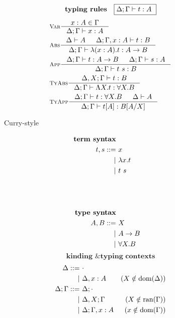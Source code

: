 \begin{figure}
\begin{singlespace}
\begin{minipage}{.46\textwidth}
\begin{align*}
\end{align*}
\[ \textbf{typing rules} \quad \framebox{$ \Delta;\Gamma |- t : A $ } \]
\vspace*{-1em}
\begin{align*}
& \inference[\sc Var]{x:A \in \Gamma}{\Delta;\Gamma |- x:A} \\
& \inference[\sc Abs]{\Delta |- A & \Delta;\Gamma,x:A |- t : B}
	             {\Delta;\Gamma |- \l(x:A).t : A -> B} \\
& \inference[\sc App]{\Delta;\Gamma |- t : A -> B & \Delta;\Gamma |- s : A}
		     {\Delta;\Gamma |- t~s : B} \\
& \inference[\sc TyAbs]{\Delta,X;\Gamma |- t : B}
		       {\Delta;\Gamma |- \L X.t : \forall X.B} \\
& \inference[\sc TyApp]{\Delta;\Gamma |- t : \forall X.B & \Delta |- A}
		       {\Delta;\Gamma |- t[A] : B[A/X]}
\end{align*}
\end{minipage}
\begin{minipage}{.46\textwidth}
	\begin{center}Curry-style\end{center}
\def\baselinestretch{0}
\small
\begin{align*}
\textbf{term syntax} \\
t,s ::= &~ x           \\
      | &~ \lambda x    . t \\
      | &~ t ~ s       \\
      \phantom{|} &~ \\
      \phantom{|} &~ \\
\\
\textbf{type syntax} \\
A,B ::= &~ X \\
      | &~ A -> B \\
      | &~ \forall X . B \\
\end{align*}
\[ \textbf{kinding \& typing contexts} \]\vspace*{-1em}
\begin{align*}\quad
\Delta ::= &~ \cdot \\
	 | &~ \Delta, x:A & (X\notin \dom(\Delta)) \\
\Delta;\Gamma ::= &~ \Delta;\cdot \\
	        | &~ \Delta,X;\Gamma    & (X\notin \ran(\Gamma)) \\
	        | &~ \Delta;\Gamma, x:A & (x\notin \dom(\Gamma)) \\

\end{align*}
\end{minipage}
\end{singlespace}
\end{figure}
